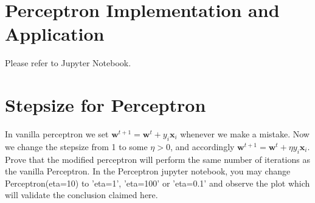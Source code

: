 \documentclass[11pt]{article}
\newcommand{\R}{\mathbb{R}}
\newcommand{\mtx}[1]{\mathbf{#1}}
\newcommand{\vct}[1]{\mathbf{#1}}
\def \mA {\mtx{A}}
\def \mZ {\mtx{Z}}
\def \vx {\vct{x}}
\def \vy {\vct{y}}
\def \R {\mathbb{R}}
\begin{document}

\newpage
\section*{Perceptron Implementation and Application}
Please refer to Jupyter Notebook.
\newpage
 \section*{Stepsize for Perceptron}
In vanilla perceptron we set $\textbf{w}^{t+1}=\textbf{w}^t+y_i\vx_i$ whenever we make a mistake. Now we change the stepsize from 1 to some $\eta>0$, and accordingly $\textbf{w}^{t+1}=\textbf{w}^t+\eta y_i\vx_i$. Prove that the modified perceptron will perform the same number of iterations as the vanilla Perceptron. In the Perceptron jupyter notebook, you may change Perceptron(eta=10) to 'eta=1', 'eta=100' or 'eta=0.1' and observe the  plot which will validate the conclusion claimed here.
\end{document}
